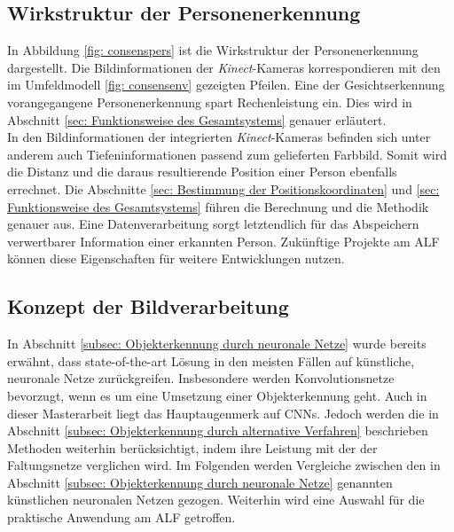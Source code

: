 		\subsection{Wirkstruktur der Personenerkennung}
		\label{subsec: Wirkstrukur Personenerkennung}
		
		
		
		
	
		In Abbildung \ref{fig: consenspers} ist die Wirkstruktur der Personenerkennung dargestellt. Die Bildinformationen der \textit{Kinect}-Kameras korrespondieren mit den im Umfeldmodell \ref{fig: consensenv} gezeigten Pfeilen. Eine der Gesichtserkennung vorangegangene Personenerkennung spart Rechenleistung ein. Dies wird in Abschnitt \ref{sec: Funktionsweise des Gesamtsystems} genauer erläutert.\\
		
		In den Bildinformationen der integrierten \textit{Kinect}-Kameras befinden sich unter anderem auch Tiefeninformationen passend zum gelieferten Farbbild. Somit wird die Distanz und die daraus resultierende Position einer Person ebenfalls errechnet. Die Abschnitte \ref{sec: Bestimmung der Positionskoordinaten} und \ref{sec: Funktionsweise des Gesamtsystems} führen die Berechnung und die Methodik genauer aus. Eine Datenverarbeitung sorgt letztendlich für das Abspeichern verwertbarer Information einer erkannten Person. Zukünftige Projekte am ALF können diese Eigenschaften für weitere Entwicklungen nutzen.\\   
		
		\subsection{Konzept der Bildverarbeitung}
		\label{subsec: Auswahl und Training der verwendeten neuronalen Netze}
		
		In Abschnitt \ref{subsec: Objekterkennung durch neuronale Netze} wurde bereits erwähnt, dass state-of-the-art Lösung in den meisten Fällen auf künstliche, neuronale Netze zurückgreifen. Insbesondere werden Konvolutionsnetze bevorzugt, wenn es um eine Umsetzung einer Objekterkennung geht. Auch in dieser Masterarbeit liegt das Hauptaugenmerk auf CNNs. Jedoch werden die in Abschnitt \ref{subsec: Objekterkennung durch alternative Verfahren} beschrieben Methoden weiterhin berücksichtigt, indem ihre Leistung mit der der Faltungsnetze verglichen wird. Im Folgenden werden Vergleiche zwischen den in Abschnitt \ref{subsec: Objekterkennung durch neuronale Netze} genannten künstlichen neuronalen Netzen gezogen. Weiterhin wird eine Auswahl für die praktische Anwendung am ALF getroffen. \\
		
